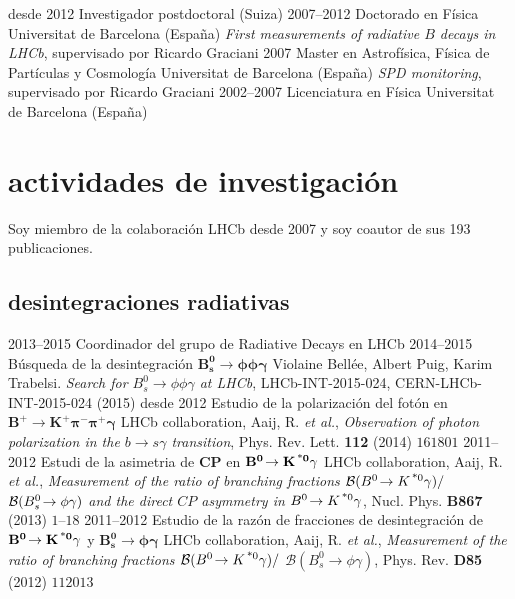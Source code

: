   \cventry
    {desde 2012}
    {Investigador postdoctoral}
    {\epfl(Suiza)}
    {}
  \cventry
    {2007--2012}
    {Doctorado en Física}
    {Universitat de Barcelona (España)}
    {\emph{First measurements of radiative $B$ decays in LHCb}, supervisado por Ricardo Graciani}
  \cventry
    {2007}
    {Master en Astrofísica, Física de Partículas y Cosmología}
    {Universitat de Barcelona (España)}
    {\emph{SPD monitoring}, supervisado por  Ricardo Graciani}
  \cventry
    {2002--2007}
    {Licenciatura en Física}
    {Universitat de Barcelona (España)}
    {}

\section{actividades de investigación}
Soy miembro de la colaboración LHCb desde 2007 y soy coautor de sus 193 publicaciones.


\subsection{desintegraciones radiativas}
    \cventry
    {2013--2015}
    {Coordinador del grupo de Radiative Decays en LHCb}
    {}
    {}
    \cventry
    {2014--2015}
    {Búsqueda de la desintegración $\mathbf{B^0_s\!\to \phi\phi\gamma}$}
    {}
    {Violaine Bellée, Albert Puig, Karim Trabelsi. \textit{Search for $B^0_s\!\to \phi\phi\gamma$ at LHCb}, LHCb-INT-2015-024, CERN-LHCb-INT-2015-024 (2015)}
    \cventry
    {desde 2012}
    {Estudio de la polarización del fotón en $\mathbf{B^+\!\to K^+\pi^-\pi^+\gamma}$}
    {}
    {LHCb collaboration, Aaij, R. \textit{et al.}, \textit{Observation of photon polarization in the $b \to s\gamma$ transition}, Phys. Rev. Lett. \textbf{112} (2014) $161801$}
    \cventry
    {2011--2012}
    {Estudi de la asimetria de $\mathbf{CP}$ en $\mathbf{B^0\!\to K^{\text{\,*}0}\gamma}$}
    {}
    {LHCb collaboration, Aaij, R. \textit{et al.}, \textit{Measurement of the ratio of branching fractions ${\cal B}(B^0\!\to K^{\text{\,*}0} \gamma) /$ ${\cal B}(B^0_s\!\to \phi \gamma)$ and the direct $CP$ asymmetry in $B^0\!\to K^{\text{\,*}0} \gamma$}, Nucl. Phys. \textbf{B867} (2013) $1$--$18$}
    \cventry
    {2011--2012}
    {Estudio de la razón de fracciones de desintegración de $\mathbf{B^0\!\to K^{\text{\,*}0}\gamma}$ y $\mathbf{B^0_s\!\to \phi\gamma}$}
    {}
    {LHCb collaboration, Aaij, R. \textit{et al.}, \textit{Measurement of the ratio of branching fractions $\mathcal{B}(B^0\!\to K^{\text{\,*}0}\gamma)/$ $\mathcal{B}(B_s^0\to\phi\gamma)$}, Phys. Rev. \textbf{D85} (2012) $112013$}

